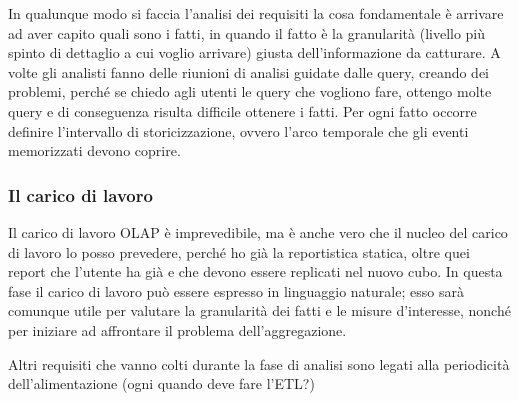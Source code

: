 In qualunque modo si faccia l’analisi dei requisiti la cosa fondamentale è arrivare ad aver capito quali sono i fatti, in quando il fatto è la granularità (livello più spinto di dettaglio a cui voglio arrivare) giusta dell’informazione da catturare. A volte gli analisti fanno delle riunioni di analisi guidate dalle query, creando dei problemi, perché se chiedo agli utenti le query che vogliono fare, ottengo molte query e di conseguenza risulta difficile ottenere i fatti. Per ogni fatto occorre definire l’intervallo di storicizzazione, ovvero l’arco temporale che gli eventi memorizzati devono coprire. 
\subsubsection{Il carico di lavoro}
Il carico di lavoro OLAP è imprevedibile, ma è anche vero che il nucleo del carico di lavoro lo posso prevedere, perché ho già la reportistica statica, oltre quei report che l’utente ha già e che devono essere replicati nel nuovo cubo. In questa fase il carico di lavoro può essere espresso in linguaggio naturale; esso sarà comunque utile per valutare la granularità dei fatti e le misure d’interesse, nonché per iniziare ad affrontare il problema dell’aggregazione. 

Altri requisiti che vanno colti durante la fase di analisi sono legati alla periodicità dell’alimentazione (ogni quando deve fare l’ETL?) 